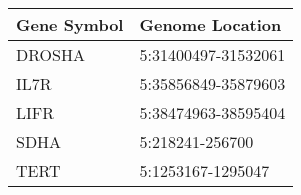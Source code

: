 \begin{tabular}{ll}
\toprule
Gene Symbol &     Genome Location \\
\midrule
     DROSHA & 5:31400497-31532061 \\
       IL7R & 5:35856849-35879603 \\
       LIFR & 5:38474963-38595404 \\
       SDHA &     5:218241-256700 \\
       TERT &   5:1253167-1295047 \\
\bottomrule
\end{tabular}
